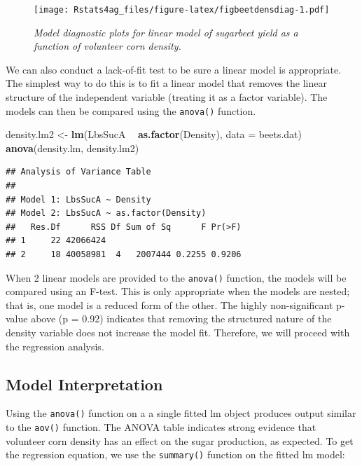 \documentclass[letterpaper,]{book}
\newenvironment{Shaded}{\begin{snugshade}}{\end{snugshade}}
\newcommand{\DataTypeTok}[1]{\textcolor[rgb]{0.13,0.29,0.53}{#1}}
\newcommand{\KeywordTok}[1]{\textcolor[rgb]{0.13,0.29,0.53}{\textbf{#1}}}
\newcommand{\NormalTok}[1]{#1}
\newcommand{\OperatorTok}[1]{\textcolor[rgb]{0.81,0.36,0.00}{\textbf{#1}}}
\newcommand{\StringTok}[1]{\textcolor[rgb]{0.31,0.60,0.02}{#1}}
\begin{document}
\begin{figure}
\centering
\texttt{[image: Rstats4ag\_files/figure-latex/figbeetdensdiag-1.pdf]}
\caption{\label{fig:figbeetdensdiag}\emph{Model diagnostic plots for linear model of sugarbeet yield as a function of volunteer corn density.}}
\end{figure}

We can also conduct a lack-of-fit test to be sure a linear model is appropriate. The simplest way to do this is to fit a linear model that removes the linear structure of the independent variable (treating it as a factor variable). The models can then be compared using the \texttt{anova()} function.

\begin{Shaded}
\begin{Highlighting}[]
\NormalTok{density.lm2 <-}\StringTok{ }\KeywordTok{lm}\NormalTok{(LbsSucA }\OperatorTok{~}\StringTok{ }\KeywordTok{as.factor}\NormalTok{(Density), }\DataTypeTok{data =}\NormalTok{ beets.dat)}
\KeywordTok{anova}\NormalTok{(density.lm, density.lm2)}
\end{Highlighting}
\end{Shaded}

\begin{verbatim}
## Analysis of Variance Table
## 
## Model 1: LbsSucA ~ Density
## Model 2: LbsSucA ~ as.factor(Density)
##   Res.Df      RSS Df Sum of Sq      F Pr(>F)
## 1     22 42066424                           
## 2     18 40058981  4   2007444 0.2255 0.9206
\end{verbatim}

When 2 linear models are provided to the \texttt{anova()} function, the models will be compared using an F-test. This is only appropriate when the models are nested; that is, one model is a reduced form of the other. The highly non-significant p-value above (p = 0.92) indicates that removing the structured nature of the density variable does not increase the model fit. Therefore, we will proceed with the regression analysis.

\hypertarget{model-interpretation}{%
\subsection{Model Interpretation}\label{model-interpretation}}

Using the \texttt{anova()} function on a a single fitted lm object produces output similar to the \texttt{aov()} function. The ANOVA table indicates strong evidence that volunteer corn density has an effect on the sugar production, as expected. To get the regression equation, we use the \texttt{summary()} function on the fitted lm model:
\end{document}
